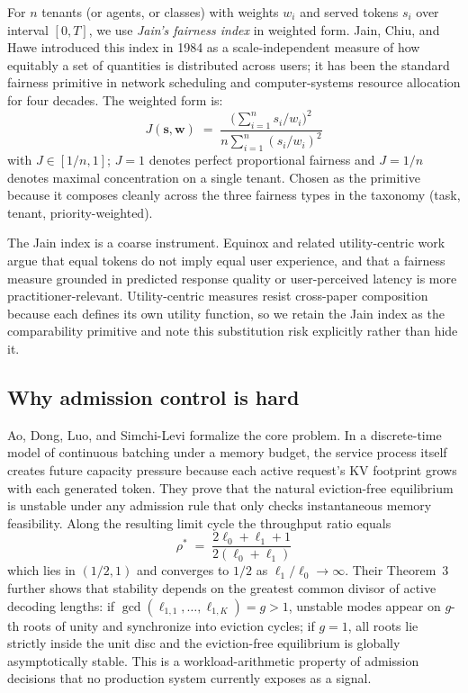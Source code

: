 \begin{definition}
\label{def:fairness}
For $n$ tenants (or agents, or classes) with weights $w_i$ and served
tokens $s_i$ over interval $[0, T]$, we use \emph{Jain's fairness
index} \citep{jain1984fairness} in weighted form. Jain, Chiu, and Hawe
introduced this index in 1984 as a scale-independent measure of how
equitably a set of quantities is distributed across users; it has
been the standard fairness primitive in network scheduling and
computer-systems resource allocation for four decades. The weighted
form is:
%
\begin{equation}
J(\mathbf{s}, \mathbf{w}) \;=\; \frac{\bigl(\sum_{i=1}^{n} s_i / w_i\bigr)^2}{n \sum_{i=1}^{n} (s_i / w_i)^2}
\label{eq:jain}
\end{equation}
%
with $J \in [1/n, 1]$; $J = 1$ denotes perfect proportional fairness
and $J = 1/n$ denotes maximal concentration on a single tenant. Chosen
as the primitive because it composes cleanly across the three
fairness types in the taxonomy (task, tenant, priority-weighted).

The Jain index is a coarse instrument. Equinox \citep{wei2025equinox}
and related utility-centric work argue that equal tokens do not imply
equal user experience, and that a fairness measure grounded in
predicted response quality or user-perceived latency is more
practitioner-relevant. Utility-centric measures resist cross-paper
composition because each defines its own utility function, so we
retain the Jain index as the comparability primitive and note this
substitution risk explicitly rather than hide it.
\end{definition}

\subsection{Why admission control is hard}
\label{sec:whyhard}

Ao, Dong, Luo, and Simchi-Levi \citep{ao2026sic} formalize the core
problem. In a discrete-time model of continuous batching under a memory
budget, the service process itself creates future capacity pressure
because each active request's KV footprint grows with each generated
token. They prove that the natural eviction-free equilibrium is
unstable under any admission rule that only checks instantaneous
memory feasibility. Along the resulting limit cycle the throughput
ratio equals
%
\begin{equation}
\rho^{\ast} \;=\; \frac{2\ell_0 + \ell_1 + 1}{2(\ell_0 + \ell_1)}
\label{eq:throughput-bound}
\end{equation}
%
which lies in $(1/2, 1)$ and converges to $1/2$ as
$\ell_1/\ell_0 \to \infty$. Their Theorem~3 further shows that
stability depends on the greatest common divisor of active decoding
lengths: if $\gcd(\ell_{1,1}, \dots, \ell_{1,K}) = g > 1$, unstable
modes appear on $g$-th roots of unity and synchronize into eviction
cycles; if $g = 1$, all roots lie strictly inside the unit disc and
the eviction-free equilibrium is globally asymptotically stable. This
is a workload-arithmetic property of admission decisions that no
production system currently exposes as a signal.

